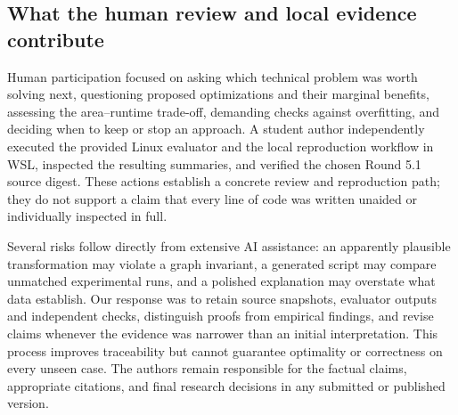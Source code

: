 \documentclass[a4paper,10pt]{article}
\theoremstyle{definition}
\theoremstyle{remark}
\newcounter{problem}
\begin{document}
\subsection{What the human review and local evidence contribute}
Human participation focused on asking which technical problem was worth solving next, questioning proposed optimizations and their marginal benefits, assessing the area--runtime trade-off, demanding checks against overfitting, and deciding when to keep or stop an approach. A student author independently executed the provided Linux evaluator and the local reproduction workflow in WSL, inspected the resulting summaries, and verified the chosen Round 5.1 source digest. These actions establish a concrete review and reproduction path; they do not support a claim that every line of code was written unaided or individually inspected in full.

Several risks follow directly from extensive AI assistance: an apparently plausible transformation may violate a graph invariant, a generated script may compare unmatched experimental runs, and a polished explanation may overstate what data establish. Our response was to retain source snapshots, evaluator outputs and independent checks, distinguish proofs from empirical findings, and revise claims whenever the evidence was narrower than an initial interpretation. This process improves traceability but cannot guarantee optimality or correctness on every unseen case. The authors remain responsible for the factual claims, appropriate citations, and final research decisions in any submitted or published version.



\end{document}
